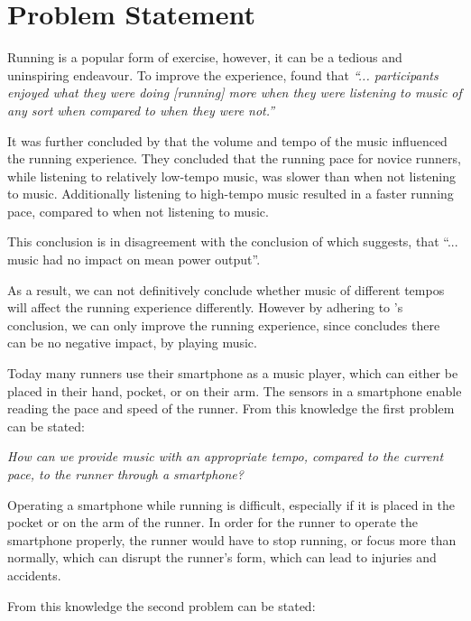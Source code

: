 \section{Problem Statement}
Running is a popular form of exercise, however, it can be a tedious and uninspiring endeavour.
To improve the experience, \citet{musicRunEffectArticle} found that 
\textit{``... participants enjoyed what they were doing [running] more when they were listening to music of any sort when compared to when they were not.''}

It was further concluded by \citet{musicRunEffectArticle} that the volume and tempo of the music influenced the running experience.
They concluded that the running pace for novice runners, while listening to relatively low-tempo music, was slower than when not listening to music. Additionally listening to high-tempo music resulted in a faster running pace, compared to when not listening to music.

This conclusion is in disagreement with the conclusion of \citet{musicNoPerformanceEffect} which suggests, that ``... music had no impact on mean power output''.

As a result, we can not definitively conclude whether music of different tempos will affect the running experience differently. 
However by adhering to \citet{musicRunEffectArticle}'s conclusion, we can only improve the running experience, since \citet{musicNoPerformanceEffect} concludes there can be no negative impact, by playing music.

Today many runners use their smartphone as a music player, which can either be placed in their hand, pocket, or on their arm.
The sensors in a smartphone enable reading the pace and speed of the runner.
From this knowledge the first problem can be stated:

\begin{center}
\textit{How can we provide music with an appropriate tempo, compared to the current pace, to the runner through a smartphone?}
\end{center}

Operating a smartphone while running is difficult, especially if it is placed in the pocket or on the arm of the runner.
In order for the runner to operate the smartphone properly, the runner would have to stop running, or focus more than normally, which can disrupt the runner's form, which can lead to injuries and accidents.

From this knowledge the second problem can be stated: 

